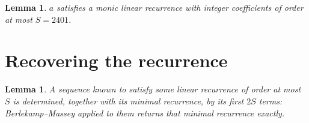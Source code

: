 \documentclass[11pt,a4paper]{article}
\theoremstyle{plain}
\newtheorem{lemma}[theorem]{Lemma}
\theoremstyle{definition}
\begin{document}
\begin{lemma}\label{lem:cf}
$a$ satisfies a monic linear recurrence with integer coefficients of order at most $S=2401$.
\end{lemma}

\section{Recovering the recurrence}

\begin{lemma}\label{lem:bm}
A sequence known to satisfy some linear recurrence of order at most $S$ is determined, together
with its minimal recurrence, by its first $2S$ terms: Berlekamp--Massey applied to them returns
that minimal recurrence exactly.
\end{lemma}
\end{document}
